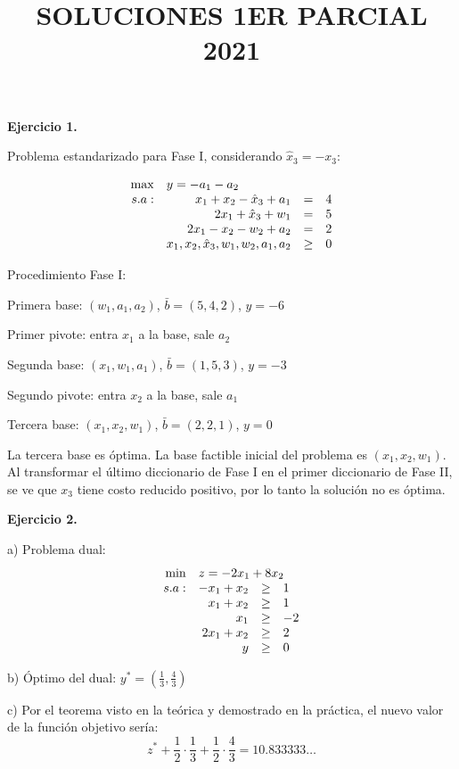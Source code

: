 \documentclass{article}
\title{SOLUCIONES 1ER PARCIAL 2021\vspace{-3em}}
\date{}
\begin{document}
\maketitle

\textbf{Ejercicio 1.}

Problema estandarizado para Fase I, considerando $\hat{x}_3=-x_3$:


    \[
    \begin{array}{rrcl}
    \max & \multicolumn{3}{l}{y = -a_1-a_2} \\
    s.a: & x_1+x_2-\hat{x}_3 + a_1 & = & 4 \\
     & 2x_1+\hat{x}_3 + w_1& = & 5 \\
     & 2x_1-x_2 -w_2 + a_2& = & 2 \\
     & x_1,x_2, \hat{x}_3, w_1, w_2,a_1, a_2 & \geq & 0 \\
    \end{array}
    \]

Procedimiento Fase I:

Primera base: $(w_1, a_1, a_2)$, $\bar{b}=(5, 4, 2)$, $y = -6$

Primer pivote: entra $x_1$ a la base, sale $a_2$

Segunda base: $(x_1, w_1, a_1)$, $\bar{b}=(1, 5, 3)$, $y = -3$

Segundo pivote: entra $x_2$ a la base, sale $a_1$

Tercera base: $(x_1, x_2, w_1)$, $\bar{b}=(2, 2, 1)$, $y = 0$

La tercera base es óptima. La base factible inicial del problema es $(x_1, x_2, w_1)$. Al transformar el último diccionario de Fase I en el primer diccionario de Fase II, se ve que $x_3$ tiene costo reducido positivo, por lo tanto la solución no es óptima.

\textbf{Ejercicio 2.}

a) Problema dual:
\[
\begin{array}{rrcl}
\min & \multicolumn{3}{l}{z = -2x_1+8x_2} \\
s.a: & -x_1+x_2 & \geq & 1 \\
 & x_1+x_2 & \geq & 1 \\
 & x_1 & \geq & -2 \\
 & 2x_1+x_2 & \geq & 2 \\
 & y & \geq & 0
\end{array}
\]

b) Óptimo del dual: $y^\ast =(\frac{1}{3}, \frac{4}{3})$

c) Por el teorema visto en la teórica y demostrado en la práctica, el nuevo valor de la función objetivo sería:
\[z^\ast + \frac{1}{2}\cdot\frac{1}{3} + \frac{1}{2}\cdot\frac{4}{3} = 10.833333\dots\]
\end{document}
